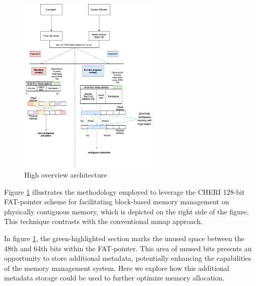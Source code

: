 \begin{figure}[h]
  \includegraphics[width=0.6\textwidth]{diagrams/HighOverviewArchitecture24.png}
  \caption{High overview architecture}
  \label{fig:HighOverviewArchitecture}
\end{figure}



Figure \ref{fig:HighOverviewArchitecture} illustrates the methodology employed to leverage the CHERI 
128-bit FAT-pointer scheme for facilitating block-based memory management
 on physically contiguous memory, which is depicted on the right side of the figure. 
 This technique contrasts with the conventional mmap approach.

In figure \ref{fig:HighOverviewArchitecture}, the green-highlighted section marks the unused space between the 48th and 64th bits
within the FAT-pointer. This area of unused bits presents an opportunity to store additional metadata,
potentially enhancing the capabilities of the memory management system. 
Here we explore how this additional metadata storage could be used to further optimize memory allocation.

